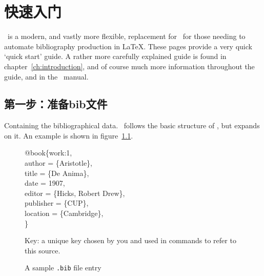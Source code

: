 \chapter{快速入门}\label{ch:quickstart}

\biblatex\ is a modern, and vastly more flexible, replacement for
\bibtex\ for those needing to automate bibliography production in
\LaTeX. These pages provide a very quick `quick start' guide. A rather
more carefully explained guide is found in
chapter~\ref{ch:introduction}, and of course much more information
throughout the guide, and in the \biblatex\ manual.


\section{第一步：准备bib文件}
Containing the bibliographical data. \biblatex\ follows the basic
structure of \bibtex, but expands on
it. An example is shown in figure~\ref{quickstart:bib}.

\begin{figure}
\strut
  \begin{minipage}[t]{0.7\linewidth}
    \ttfamily
 @book\{\colorbox{blue!15}{work:1},\\
  author       = \{Aristotle\},\\
  title        = \{De Anima\},\\
  date         = 1907,\\
  editor       = \{Hicks, Robert Drew\},\\
  publisher    = \{CUP\},\\
  location     = \{Cambridge\},\\
\}\\
\end{minipage}\begin{minipage}[t]{0.7\linewidth}
  \small\sffamily\strut\vspace{1pc}

   Key: a unique
key chosen by you and used in  commands to refer to this
source.
\end{minipage}
\caption{A sample \texttt{.bib} file entry}
\label{quickstart:bib}
\end{figure}

